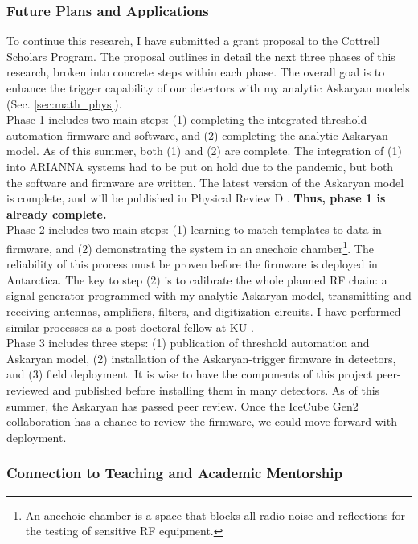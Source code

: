 \documentclass[../../../main.tex]{subfiles}
\begin{document}
\subsubsection{Future Plans and Applications}

To continue this research, I have submitted a grant proposal to the Cottrell Scholars Program.  The proposal outlines in detail the next three phases of this research, broken into concrete steps within each phase.  The overall goal is to enhance the trigger capability of our detectors with my analytic Askaryan models (Sec. \ref{sec:math_phys}).
\\
\vspace{0.25cm}
Phase 1 includes two main steps: (1) completing the integrated threshold automation firmware and software, and (2) completing the analytic Askaryan model.  As of this summer, both (1) and (2) are complete.  The integration of (1) into ARIANNA systems had to be put on hold due to the pandemic, but both the software and firmware are written.  The latest version of the Askaryan model is complete, and will be published in Physical Review D \cite{time}.  \textbf{Thus, phase 1 is already complete.}
\\
\vspace{0.25cm}
Phase 2 includes two main steps: (1) learning to match templates to data in firmware, and (2) demonstrating the system in an anechoic chamber\footnote{An anechoic chamber is a space that blocks all radio noise and reflections for the testing of sensitive RF equipment.}.  The reliability of this process must be proven before the firmware is deployed in Antarctica.  The key to step (2) is to calibrate the whole planned RF chain: a signal generator programmed with my analytic Askaryan model, transmitting and receiving antennas, amplifiers, filters, and digitization circuits.  I have performed similar processes as a post-doctoral fellow at KU \cite{10.1016/j.astropartphys.2014.09.002}.
\\
\vspace{0.25cm}
Phase 3 includes three steps: (1) publication of threshold automation and Askaryan model, (2) installation of the Askaryan-trigger firmware in detectors, and (3) field deployment.  It is wise to have the components of this project peer-reviewed and published before installing them in many detectors.  As of this summer, the Askaryan has passed peer review.  Once the IceCube Gen2 collaboration has a chance to review the firmware, we could move forward with deployment.

\subsubsection{Connection to Teaching and Academic Mentorship}
\end{document}

